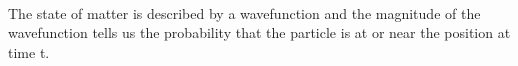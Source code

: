 \begin{frame}  
    \begin{tcolorbox3}[Conclusion]
        ~~\\
       {\large The state of matter is described by a wavefunction and the magnitude of the wavefunction 
       tells us the probability that the particle is at or near the position at time t.}
    \end{tcolorbox3} 
\end{frame} 

\begin{frame}
    \frametitle{}
    \centering
\end{frame}

